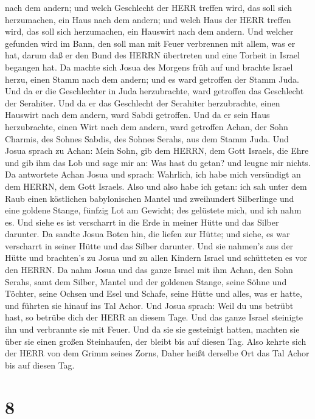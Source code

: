 nach dem andern; und welch Geschlecht der HERR treffen wird, das soll
sich herzumachen, ein Haus nach dem andern; und welch Haus der HERR
treffen wird, das soll sich herzumachen, ein Hauswirt nach dem andern.
 Und welcher gefunden wird im Bann, den soll man mit Feuer
verbrennen mit allem, was er hat, darum daß er den Bund des HERRN
übertreten und eine Torheit in Israel begangen hat.  Da
machte sich Josua des Morgens früh auf und brachte Israel herzu, einen
Stamm nach dem andern; und es ward getroffen der Stamm Juda.
 Und da er die Geschlechter in Juda herzubrachte, ward
getroffen das Geschlecht der Serahiter. Und da er das Geschlecht der
Serahiter herzubrachte, einen Hauswirt nach dem andern, ward Sabdi
getroffen.  Und da er sein Haus herzubrachte, einen Wirt
nach dem andern, ward getroffen Achan, der Sohn Charmis, des Sohnes
Sabdis, des Sohnes Serahs, aus dem Stamm Juda.  Und Josua
sprach zu Achan: Mein Sohn, gib dem HERRN, dem Gott Israels, die Ehre
und gib ihm das Lob und sage mir an: Was hast du getan? und leugne mir
nichts.  Da antwortete Achan Josua und sprach: Wahrlich,
ich habe mich versündigt an dem HERRN, dem Gott Israels. Also und also
habe ich getan:  ich sah unter dem Raub einen köstlichen
babylonischen Mantel und zweihundert Silberlinge und eine goldene
Stange, fünfzig Lot am Gewicht; des gelüstete mich, und ich nahm es. Und
siehe es ist verscharrt in die Erde in meiner Hütte und das Silber
darunter.  Da sandte Josua Boten hin, die liefen zur Hütte;
und siehe, es war verscharrt in seiner Hütte und das Silber darunter.
 Und sie nahmen's aus der Hütte und brachten's zu Josua und
zu allen Kindern Israel und schütteten es vor den HERRN. 
Da nahm Josua und das ganze Israel mit ihm Achan, den Sohn Serahs, samt
dem Silber, Mantel und der goldenen Stange, seine Söhne und Töchter,
seine Ochsen und Esel und Schafe, seine Hütte und alles, was er hatte,
und führten sie hinauf ins Tal Achor.  Und Josua sprach:
Weil du uns betrübt hast, so betrübe dich der HERR an diesem Tage. Und
das ganze Israel steinigte ihn und verbrannte sie mit Feuer. Und da sie
sie gesteinigt hatten,  machten sie über sie einen großen
Steinhaufen, der bleibt bis auf diesen Tag. Also kehrte sich der HERR
von dem Grimm seines Zorns, Daher heißt derselbe Ort das Tal Achor bis
auf diesen Tag.

\hypertarget{section-7}{%
\section{8}\label{section-7}}


